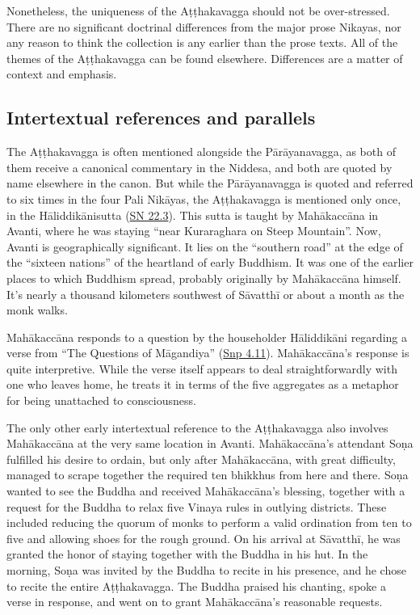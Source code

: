 \documentclass[12pt,openany]{book}%
\begin{document}
Nonetheless, the uniqueness of the \textsanskrit{Aṭṭhakavagga} should not be over-stressed. There are no significant doctrinal differences from the major prose Nikayas, nor any reason to think the collection is any earlier than the prose texts. All of the themes of the \textsanskrit{Aṭṭhakavagga} can be found elsewhere. Differences are a matter of context and emphasis.

\subsection*{Intertextual references and parallels}

The \textsanskrit{Aṭṭhakavagga} is often mentioned alongside the \textsanskrit{Pārāyanavagga}, as both of them receive a canonical commentary in the Niddesa, and both are quoted by name elsewhere in the canon. But while the \textsanskrit{Pārāyanavagga} is quoted and referred to six times in the four Pali \textsanskrit{Nikāyas}, the \textsanskrit{Aṭṭhakavagga} is mentioned only once, in the \textsanskrit{Hāliddikānisutta} (\href{https://suttacentral.net/sn22.3/en/sujato}{SN 22.3}). This sutta is taught by \textsanskrit{Mahākaccāna} in Avanti, where he was staying “near Kuraraghara on Steep Mountain”. Now, Avanti is geographically significant. It lies on the “southern road” at the edge of the “sixteen nations” of the heartland of early Buddhism. It was one of the earlier places to which Buddhism spread, probably originally by \textsanskrit{Mahākaccāna} himself. It’s nearly a thousand kilometers southwest of \textsanskrit{Sāvatthī} or about a month as the monk walks.

\textsanskrit{Mahākaccāna} responds to a question by the householder \textsanskrit{Hāliddikāni} regarding a verse from “The Questions of \textsanskrit{Māgandiya}” (\href{https://suttacentral.net/snp4.11/en/sujato}{Snp 4.11}). \textsanskrit{Mahākaccāna}’s response is quite interpretive. While the verse itself appears to deal straightforwardly with one who leaves home, he treats it in terms of the five aggregates as a metaphor for being unattached to consciousness.

The only other early intertextual reference to the \textsanskrit{Aṭṭhakavagga} also involves \textsanskrit{Mahākaccāna} at the very same location in Avanti. \textsanskrit{Mahākaccāna}’s attendant \textsanskrit{Soṇa} fulfilled his desire to ordain, but only after \textsanskrit{Mahākaccāna}, with great difficulty, managed to scrape together the required ten bhikkhus from here and there. \textsanskrit{Soṇa} wanted to see the Buddha and received \textsanskrit{Mahākaccāna}’s blessing, together with a request for the Buddha to relax five Vinaya rules in outlying districts. These included reducing the quorum of monks to perform a valid ordination from ten to five and allowing shoes for the rough ground. On his arrival at \textsanskrit{Sāvatthī}, he was granted the honor of staying together with the Buddha in his hut. In the morning, \textsanskrit{Soṇa} was invited by the Buddha to recite in his presence, and he chose to recite the entire \textsanskrit{Aṭṭhakavagga}. The Buddha praised his chanting, spoke a verse in response, and went on to grant \textsanskrit{Mahākaccāna}’s reasonable requests.
\end{document}
